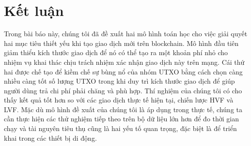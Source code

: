 \newpage
\section{Kết luận}

Trong bài báo này, chúng tôi đã đề xuất hai mô hình toán học cho việc giải quyết hai mục tiêu thiết yếu khi tạo giao dịch mới trên blockchain. Mô hình đầu tiên giảm thiểu kích thước giao dịch để nó có thể tạo ra một khoản phí nhỏ cho nhiệm vụ khai thác chịu trách nhiệm xác nhận giao dịch này trên mạng. Cái thứ hai được chế tạo để kiềm chế sự bùng nổ của nhóm UTXO bằng cách chọn càng nhiều càng tốt số lượng UTXO trong khi duy trì kích thước giao dịch để giúp người dùng trả chi phí phải chăng và phù hợp. Thí nghiệm của chúng tôi có cho thấy kết quả tốt hơn so với các giao dịch thực tế hiện tại, chiến lược HVF và LVF. Mặc dù mô hình đề xuất của chúng tôi là áp dụng trong thực tế, chúng ta cần thực hiện các thử nghiệm tiếp theo trên bộ dữ liệu lớn hơn để đo thời gian chạy và tài nguyên tiêu thụ cũng là hai yếu tố quan trọng, đặc biệt là để triển khai trong các thiết bị di động.
